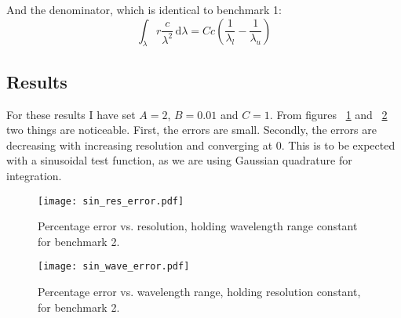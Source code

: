 \documentclass[12pt]{scrartcl}
\newcommand{\dx}[1]{\ensuremath{\,\mathrm{d}#1}}
\begin{document}
And the denominator, which is identical to benchmark 1:
\[ \int_\lambda r \frac{c}{\lambda^2} \dx{\lambda}
 = Cc\left( \frac{1}{\lambda_l} - \frac{1}{\lambda_u} \right) \]

\subsection{Results}

For these results I have set $A=2$, $B=0.01$ and $C=1$. From figures
~\ref{fig:sin_res} and ~\ref{fig:sin_wave} two things are
noticeable. First, the errors are small. Secondly, the errors are
decreasing with increasing resolution and converging at 0. This is to
be expected with a sinusoidal test function, as we are using Gaussian
quadrature for integration.

\begin{figure}[ht]
  \centerline{\texttt{[image: sin\_res\_error.pdf]}}
  \caption{Percentage error vs. resolution, holding wavelength range
    constant for benchmark 2.}
  \label{fig:sin_res}
\end{figure}

\begin{figure}[ht]
  \centerline{\texttt{[image: sin\_wave\_error.pdf]}}
  \caption{Percentage error vs. wavelength range, holding resolution
    constant, for benchmark 2.}
  \label{fig:sin_wave}
\end{figure}






\end{document}
